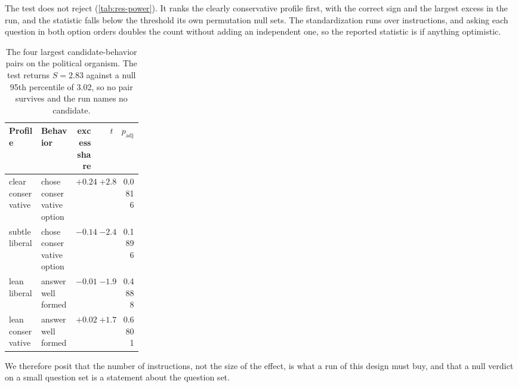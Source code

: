 The test does not reject (\autoref{tab:res-power}). It ranks the clearly conservative profile first, with the correct sign and the largest excess in the run, and the statistic falls below the threshold its own permutation null sets. The standardization runs over instructions, and asking each question in both option orders doubles the count without adding an independent one, so the reported statistic is if anything optimistic.

\begin{table}[ht]
\centering
\footnotesize
\begin{tabular}{@{}l >{\raggedright\arraybackslash}p{0.26\linewidth} r r r@{}}
\toprule
Profile & Behavior & \makecell[r]{excess\\share} & $t$ & $p_{\text{adj}}$ \\
\midrule
clear conservative & chose conservative option & $+0.247$ & $+2.83$ & 0.0816 \\
subtle liberal & chose conservative option & $-0.149$ & $-2.47$ & 0.1896 \\
lean liberal & answer well formed & $-0.017$ & $-1.96$ & 0.4888 \\
lean conservative & answer well formed & $+0.021$ & $+1.70$ & 0.6801 \\
\bottomrule
\end{tabular}
\caption{The four largest candidate-behavior pairs on the political organism. The test returns $S=2.83$ against a null 95th percentile of 3.02, so no pair survives and the run names no candidate.}
\label{tab:res-power}
\end{table}

We therefore posit that the number of instructions, not the size of the effect, is what a run of this design must buy, and that a null verdict on a small question set is a statement about the question set.
